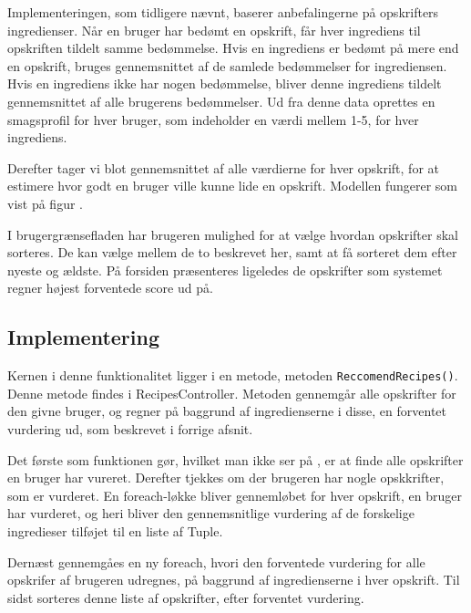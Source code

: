 Implementeringen, som tidligere nævnt, baserer anbefalingerne på opskrifters ingredienser.
Når en bruger har bedømt en opskrift, får hver ingrediens til opskriften tildelt samme bedømmelse.
Hvis en ingrediens er bedømt på mere end en opskrift, bruges gennemsnittet af de samlede bedømmelser for ingrediensen.
Hvis en ingrediens ikke har nogen bedømmelse, bliver denne ingrediens tildelt gennemsnittet af alle brugerens bedømmelser.
Ud fra denne data oprettes en smagsprofil for hver bruger, som indeholder en værdi mellem 1-5, for hver ingrediens.

Derefter tager vi blot gennemsnittet af alle værdierne for hver opskrift, for at estimere hvor godt en bruger ville kunne lide en opskrift.
Modellen fungerer som vist på figur .


I brugergrænsefladen har brugeren mulighed for at vælge hvordan opskrifter skal sorteres.
De kan vælge mellem de to beskrevet her, samt at få sorteret dem efter nyeste og ældste.
På forsiden præsenteres ligeledes de opskrifter som systemet regner højest forventede score ud på.

\subsection{Implementering}
Kernen i denne funktionalitet ligger i en metode, metoden \texttt{ReccomendRecipes()}.
Denne metode findes i RecipesController.
Metoden gennemgår alle opskrifter for den givne bruger, og regner på baggrund af ingredienserne i disse, en forventet vurdering ud, som beskrevet i forrige afsnit.

Det første som funktionen gør, hvilket man ikke ser på , er at finde alle opskrifter en bruger har vureret.
Derefter tjekkes om der brugeren har nogle opskkrifter, som er vurderet.
En foreach-løkke bliver gennemløbet for hver opskrift, en bruger har vurderet, og heri bliver den gennemsnitlige vurdering af de forskelige ingredieser tilføjet til en liste af Tuple.

Dernæst gennemgåes en ny foreach, hvori den forventede vurdering for alle opskrifer af brugeren udregnes, på baggrund af ingredienserne i hver opskrift.
Til sidst sorteres denne liste af opskrifter, efter forventet vurdering.


